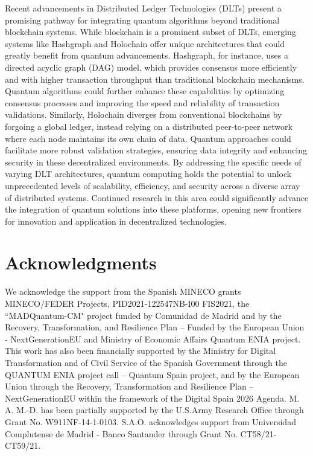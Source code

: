 \documentclass[nofootinbib,aps,prd,reprint,superscriptaddress,floatfix]{revtex4-2}
\begin{document}
Recent advancements in Distributed Ledger Technologies (DLTs) present a promising pathway for integrating quantum algorithms beyond traditional blockchain systems. While blockchain is a prominent subset of DLTs, emerging systems like Hashgraph \cite{Hashgraph} and Holochain \cite{Holochain} offer unique architectures that could greatly benefit from quantum advancements. Hashgraph, for instance, uses a directed acyclic graph (DAG) model, which provides consensus more efficiently and with higher transaction throughput than traditional blockchain mechanisms. Quantum algorithms could further enhance these capabilities by optimizing consensus processes and improving the speed and reliability of transaction validations. Similarly, Holochain diverges from conventional blockchains by forgoing a global ledger, instead relying on a distributed peer-to-peer network where each node maintains its own chain of data. Quantum approaches could facilitate more robust validation strategies, ensuring data integrity and enhancing security in these decentralized environments. By addressing the specific needs of varying DLT architectures, quantum computing holds the potential to unlock unprecedented levels of scalability, efficiency, and security across a diverse array of distributed systems. Continued research in this area could significantly advance the integration of quantum solutions into these platforms, opening new frontiers for innovation and application in decentralized technologies.

\section*{Acknowledgments}

We acknowledge the support from the Spanish MINECO grants MINECO/FEDER Projects,  PID2021-122547NB-I00 FIS2021, the “MADQuantum-CM" project funded by Comunidad de Madrid and by the Recovery, Transformation, and Resilience Plan – Funded by the European Union - NextGenerationEU and Ministry of Economic Affairs Quantum ENIA project. This work has also been financially supported by the Ministry for Digital Transformation and of Civil Service of the Spanish Government through the QUANTUM ENIA project call – Quantum Spain project, and by the European Union through the Recovery, Transformation and Resilience Plan – NextGenerationEU within the framework of the Digital Spain 2026 Agenda. M. A. M.-D. has been partially supported by the U.S.Army Research Office through Grant No. W911NF-14-1-0103. S.A.O. acknowledges support from Universidad Complutense de Madrid - Banco Santander through Grant No. CT58/21-CT59/21.

\newpage



\end{document}
